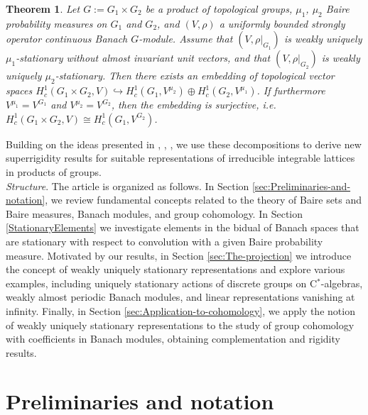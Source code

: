 \documentclass[a4paper,11pt,reqno]{amsart}
\numberwithin{equation}{section}
\newtheorem{letterthm}{Theorem}
\theoremstyle{definition}
\theoremstyle{remark}
\theoremstyle{remark}
\begin{document}
\begin{letterthm} Let $G:=G_{1}\times G_{2}$ be a product of topological groups, $\mu_{1}$, $\mu_{2}$ Baire probability measures on $G_{1}$ and $G_{2}$, and $(V,\rho)$ a uniformly bounded strongly operator continuous Banach $G$-module. Assume that $(V,\rho|_{G_{1}})$ is weakly uniquely $\mu_{1}$-stationary without almost invariant unit vectors, and that $(V,\rho|_{G_{2}})$ is weakly uniquely $\mu_{2}$-stationary. Then there exists an embedding of topological vector spaces $H_{c}^{1}(G_{1}\times G_{2},V)\hookrightarrow H_{c}^{1}(G_{1},V^{\mu_{2}})\oplus H_{c}^{1}(G_{2},V^{\mu_{1}})$. If furthermore $V^{\mu_{1}}=V^{G_{1}}$ and $V^{\mu_{2}}=V^{G_{2}}$, then the embedding is surjective, i.e. $H_{c}^{1}(G_{1}\times G_{2},V)\cong H_{c}^{1}(G_{1},V^{G_{2}})$. \end{letterthm}

Building on the ideas presented in \cite{Shalom00}, \cite{BaderFurmanGelanderMonod}, \cite{Creutz11}, we use these decompositions to derive new superrigidity results for suitable representations of irreducible integrable lattices in products of groups.\\

\noindent \emph{Structure}. The article is organized as follows. In Section \ref{sec:Preliminaries-and-notation}, we review fundamental concepts related to the theory of Baire sets and Baire measures, Banach modules, and group cohomology. In Section \ref{StationaryElements} we investigate elements in the bidual of Banach spaces that are stationary with respect to convolution with a given Baire probability measure. Motivated by our results, in Section \ref{sec:The-projection} we introduce the concept of weakly uniquely stationary representations and explore various examples, including uniquely stationary actions of discrete groups on C$^{\ast}$-algebras, weakly almost periodic Banach modules, and linear representations vanishing at infinity. Finally, in Section \ref{sec:Application-to-cohomology}, we apply the notion of weakly uniquely stationary representations to the study of group cohomology with coefficients in Banach modules, obtaining complementation and rigidity results.

\vspace{3mm}



\section{Preliminaries and notation\label{sec:Preliminaries-and-notation}}
\end{document}
